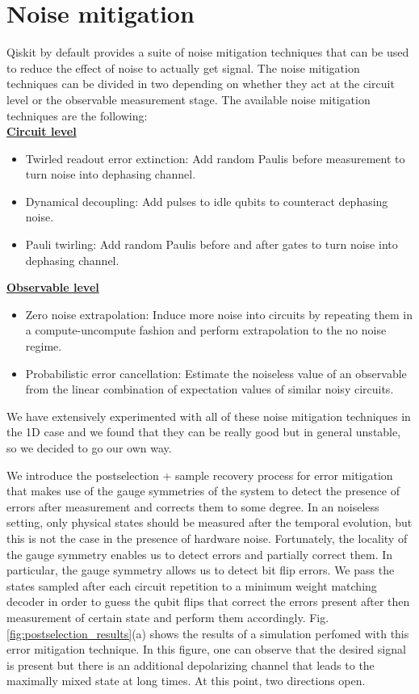 \documentclass[a4paper]{article}
\begin{document}
\section{Noise mitigation} \label{sec:noise_mitigation}

Qiskit by default provides a suite of noise mitigation techniques that can be used to reduce the effect of noise to actually get signal. The noise mitigation techniques can be divided in two depending on whether they act at the circuit level or the observable measurement stage. The available noise mitigation techniques are the following: \\

\textbf{\underline{Circuit level}}

\begin{itemize}
    \item Twirled readout error extinction: Add random Paulis before measurement to turn noise into dephasing channel.
    \item Dynamical decoupling: Add pulses to idle qubits to counteract dephasing noise.
    \item Pauli twirling: Add random Paulis before and after gates to turn noise into dephasing channel.
\end{itemize}

\textbf{\underline{Observable level}}

\begin{itemize}
    \item Zero noise extrapolation: Induce more noise into circuits by repeating them in a compute-uncompute fashion and perform extrapolation to the no noise regime.
    \item Probabilistic error cancellation: Estimate the noiseless value of an observable from the linear combination of expectation values of similar noisy circuits.
\end{itemize}

We have extensively experimented with all of these noise mitigation techniques in the 1D case and we found that they can be really good but in general unstable, so we decided to go our own way.

We introduce the postselection + sample recovery process for error mitigation that makes use of the gauge symmetries of the system to detect the presence of errors after measurement and corrects them to some degree. In an noiseless setting, only physical states should be measured after the temporal evolution, but this is not the case in the presence of hardware noise. Fortunately, the locality of the gauge symmetry enables us to detect errors and partially correct them. In particular, the gauge symmetry allows us to detect bit flip errors. We pass the states sampled after each circuit repetition to a minimum weight matching decoder in order to guess the qubit flips that correct the errors present after then measurement of certain state and perform them accordingly. Fig.\ref{fig:postselection_results}(a) shows the results of a simulation perfomed with this error mitigation technique. In this figure, one can observe that the desired signal is present but there is an additional depolarizing channel that leads to the maximally mixed state at long times. At this point, two directions open. 
\end{document}
